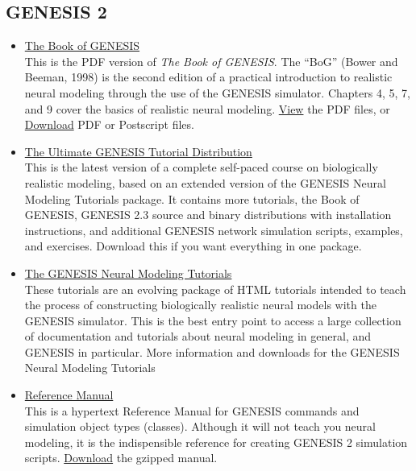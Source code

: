 \documentclass[12pt]{article}
\begin{document}
\subsection*{GENESIS 2}

\begin{itemize}
 
 \item \href{http://www.genesis-sim.org/GENESIS/bog/bog.html}{The Book of GENESIS}\\
 This is the PDF version of {\it The Book of GENESIS}. The ``BoG'' (Bower and Beeman, 1998) is the second edition of a practical introduction to realistic neural modeling through the use of the GENESIS simulator. Chapters 4, 5, 7, and 9 cover the basics of realistic neural modeling.  \href{http://www.genesis-sim.org/GENESIS/iBoG/iBoGpdf/index.html}{View} the PDF files, or \href{http://www.genesis-sim.org/GENESIS/iBoG/index.html}{Download} PDF or Postscript files.

\item \href{http://www.genesis-sim.org/GENESIS/UGTD.html}{The Ultimate GENESIS Tutorial Distribution}\\
This is the latest version of a complete self-paced course on biologically realistic modeling, based on an extended version of the GENESIS Neural Modeling Tutorials package. It contains more tutorials, the Book of GENESIS, GENESIS 2.3 source and binary distributions with installation instructions, and additional GENESIS network simulation scripts, examples, and exercises. Download this if you want everything in one package.

\item \href{http://www.genesis-sim.org/GENESIS/GNMT.html}{The GENESIS Neural Modeling Tutorials}\\
These tutorials are an evolving package of HTML tutorials intended to teach the process of constructing biologically realistic neural models with the GENESIS simulator. This is the best entry point to access a large collection of documentation and tutorials about neural modeling in general, and GENESIS in particular. More information and downloads for the GENESIS Neural Modeling Tutorials

 \item \href{http://www.genesis-sim.org/GENESIS/Hyperdoc/Manual.html}{Reference Manual}\\
This is a hypertext Reference Manual for GENESIS commands and simulation object types (classes). Although it will not teach you neural modeling, it is the indispensible reference for creating GENESIS 2 simulation scripts. \href{http://www.genesis-sim.org/genesis-ftp/}{Download} the gzipped manual.


\end{itemize}
\end{document}
